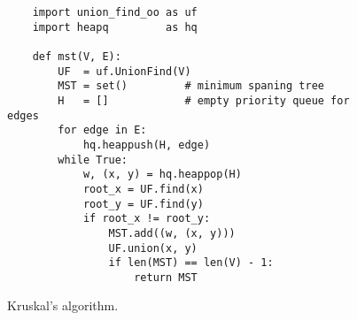 \begin{figure}[!ht]
\centering
\begin{verbatim}
    import union_find_oo as uf
    import heapq         as hq

    def mst(V, E):
        UF  = uf.UnionFind(V)
        MST = set()         # minimum spaning tree
        H   = []            # empty priority queue for edges
        for edge in E:
            hq.heappush(H, edge)
        while True:
            w, (x, y) = hq.heappop(H)
            root_x = UF.find(x)
            root_y = UF.find(y)
            if root_x != root_y:
                MST.add((w, (x, y)))
                UF.union(x, y)
                if len(MST) == len(V) - 1:
                    return MST
\end{verbatim}
\vspace*{-0.3cm}
\caption{Kruskal's algorithm.}
\label{fig:Kruskal.ipynb}
\end{figure}

